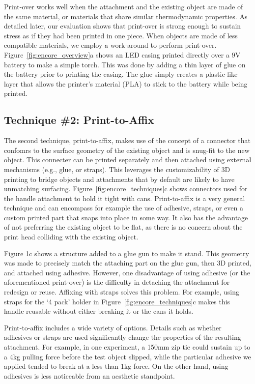 Print-over works well when the attachment and the existing object are made of the same material, or materials that share similar thermodynamic properties. As detailed later, our evaluation shows that print-over is strong enough to sustain stress as if they had been printed in one piece. When objects are made of less compatible materials, we employ a work-around to perform print-over. Figure~\ref{fig:encore_overview}a shows an LED casing printed directly over a 9V battery to make a simple torch. This was done by adding a thin layer of glue on the battery prior to printing the casing. The glue simply creates a plastic-like layer that allows the printer's material (PLA) to stick to the battery while being printed.

\subsection{Technique \#2: Print-to-Affix}
The second technique, print-to-affix, makes use of the concept of a connector that confomrs to the surface geometry of the existing object and is snug-fit to the new object. This connecter can be printed separately and then attached using external mechanisms (e.g., glue, or straps). This leverages the customizability of 3D printing to bridge objects and attachments that by default are likely to have unmatching surfacing. Figure~\ref{fig:encore_techniques}c shows connectors used for the handle attachment to hold it tight with cans. Print-to-affix is a very general technique and can encompass for example the use of adhesive, straps, or even a custom printed part that snaps into place in some way. It also has the advantage of not preferring the existing object to be flat, as there is no concern about the print head colliding with the existing object.

Figure 1c shows a structure added to a glue gun to make it stand. This geometry was made to precisely match the attaching part on the glue gun, then 3D printed, and attached using adhesive. However, one disadvantage of using adhesive (or the aforementioned print-over) is the difficulty in detaching the attachment for redesign or reuse. Affixing with straps solves this problem. For example, using straps for the `4 pack' holder in Figure~\ref{fig:encore_techniques}c makes this handle reusable without either breaking it or the cans it holds.

Print-to-affix includes a wide variety of options. Details such as whether adhesives or straps are used significantly change the properties of the resulting attachment. For example, in one experiment, a 150mm zip tie could sustain up to a 4kg pulling force before the test object slipped, while the particular adhesive we applied tended to break at a less than 1kg force. On the other hand, using adhesives is less noticeable from an aesthetic standpoint.

